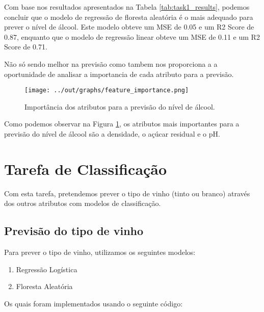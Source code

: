 \documentclass{article}
\begin{document}
Com base nos resultados apresentados na Tabela \ref{tab:task1_results}, podemos concluir que o modelo de regressão de floresta aleatória é o mais adequado para prever o nível de álcool. Este modelo obteve um MSE de 0.05 e um R2 Score de 0.87, enquanto que o modelo de regressão linear obteve um MSE de 0.11 e um R2 Score de 0.71.

Não só sendo melhor na previsão como tambem nos proporciona a a oportunidade de analisar a importancia de cada atributo para a previsão.

\begin{figure}[ht]
  \centering
  \texttt{[image: ../out/graphs/feature\_importance.png]}
  \caption{Importância dos atributos para a previsão do nível de álcool.}
  \label{fig:task1_feature_importance}
\end{figure}

Como podemos observar na Figura \ref{fig:task1_feature_importance}, os atributos mais importantes para a previsão do nível de álcool são a densidade, o açúcar residual e o pH.

\section{Tarefa de Classificação}

Com esta tarefa, pretendemos prever o tipo de vinho (tinto ou branco) através dos outros atributos com modelos de classificação.

\subsection{Previsão do tipo de vinho}

Para prever o tipo de vinho, utilizamos os seguintes modelos:

\begin{enumerate}
  \item Regressão Logística
  \item Floresta Aleatória
\end{enumerate}

Os quais foram implementados usando o seguinte código:
\end{document}
